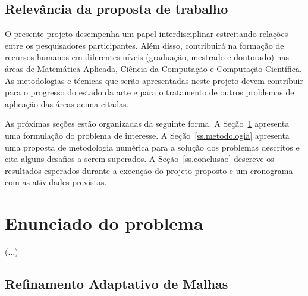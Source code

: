 \documentclass[12pt]{article}
\begin{document}
\subsection{Relevância da proposta de trabalho}

O presente projeto desempenha um papel interdisciplinar estreitando relações entre os pesquisadores participantes. Além disso, contribuirá na formação de recursos humanos em diferentes níveis (graduação, mestrado e doutorado) nas áreas de Matemática Aplicada, Ciência da Computação e Computação Científica. As metodologias e técnicas que serão apresentadas neste projeto devem contribuir para o progresso do estado da arte e para o tratamento de outros problemas de aplicação das áreas acima citadas.  

As próximas seções estão organizadas da seguinte forma. A Seção~\ref{ss.problema} apresenta uma formulação do problema de interesse. A Seção~\ref{ss.metodologia} apresenta uma proposta de metodologia numérica para a solução dos problemas descritos e cita alguns desafios a serem superados. A Seção~\ref{ss.conclusao} descreve os resultados esperados durante a execução do projeto proposto e um cronograma com as atividades previstas.

\section{Enunciado do problema}\label{ss.problema}

(...)

\subsection{Refinamento Adaptativo de Malhas}
\end{document}
